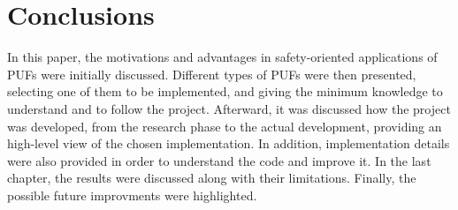 \chapter{Conclusions}
In this paper, the motivations and advantages in safety-oriented applications of PUFs were initially discussed. Different types of PUFs were then presented, selecting one of them to be implemented, and giving the minimum knowledge to understand and to follow the project.
Afterward, it was discussed how the project was developed, from the research phase to the actual development, providing an high-level view of the chosen implementation.
In addition, implementation details were also provided in order to understand the code and improve it.
In the last chapter, the results were discussed along with their limitations. Finally, the possible future improvments were highlighted.
